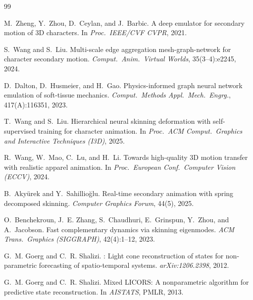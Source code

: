 \documentclass[10pt,twocolumn]{article}
\begin{document}

\begin{thebibliography}{99}


M.~Zheng, Y.~Zhou, D.~Ceylan, and J.~Barbic.
\newblock A deep emulator for secondary motion of {3D} characters.
\newblock In \emph{Proc.\ IEEE/CVF CVPR}, 2021.

S.~Wang and S.~Liu.
\newblock Multi-scale edge aggregation mesh-graph-network for character secondary motion.
\newblock \emph{Comput.\ Anim.\ Virtual Worlds}, 35(3--4):e2245, 2024.

D.~Dalton, D.~Husmeier, and H.~Gao.
\newblock Physics-informed graph neural network emulation of soft-tissue mechanics.
\newblock \emph{Comput.\ Methods Appl.\ Mech.\ Engrg.}, 417(A):116351, 2023.

T.~Wang and S.~Liu.
\newblock Hierarchical neural skinning deformation with self-supervised training for character animation.
\newblock In \emph{Proc.\ ACM Comput.\ Graphics and Interactive Techniques (I3D)}, 2025.

R.~Wang, W.~Mao, C.~Lu, and H.~Li.
\newblock Towards high-quality {3D} motion transfer with realistic apparel animation.
\newblock In \emph{Proc.\ European Conf.\ Computer Vision (ECCV)}, 2024.

B.~Aky\"{u}rek and Y.~Sahillio\u{g}lu.
\newblock Real-time secondary animation with spring decomposed skinning.
\newblock \emph{Computer Graphics Forum}, 44(5), 2025.

O.~Benchekroun, J.~E. Zhang, S.~Chaudhuri, E.~Grinspun, Y.~Zhou, and A.~Jacobson.
\newblock Fast complementary dynamics via skinning eigenmodes.
\newblock \emph{ACM Trans.\ Graphics (SIGGRAPH)}, 42(4):1--12, 2023.


G.~M. Goerg and C.~R. Shalizi.
: Light cone reconstruction of states for non-parametric forecasting of spatio-temporal systems.
\newblock \emph{arXiv:1206.2398}, 2012.

G.~M. Goerg and C.~R. Shalizi.
\newblock Mixed {LICORS}: A nonparametric algorithm for predictive state reconstruction.
\newblock In \emph{AISTATS}, PMLR, 2013.


\end{thebibliography}
\end{document}
